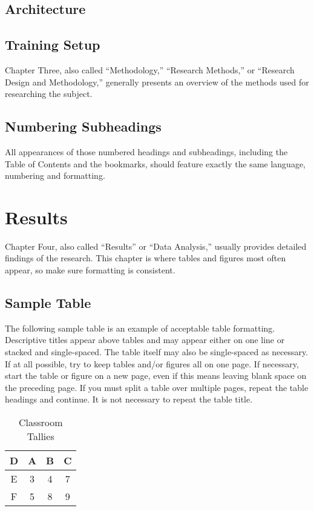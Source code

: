 \documentclass{UCF_ETD}
\begin{document}
\section{Architecture}

\section{Training Setup}

Chapter Three, also called “Methodology,” “Research Methods,” or “Research Design and Methodology,” generally presents an overview of the methods used for researching the subject.

\section{Numbering Subheadings}
All appearances of those numbered headings and subheadings, including the Table of Contents and the bookmarks, should feature exactly the same language, numbering and formatting.

\chapter{Results}
Chapter Four, also called ``Results'' or ``Data Analysis,'' usually provides detailed findings of the research.  This chapter is where tables and figures most often appear, so make sure formatting is consistent.

\section{Sample Table}
The following sample table is an example of acceptable table formatting. Descriptive titles appear above tables and may appear either on one line or stacked and single-spaced. The table itself may also be single-spaced as necessary. If at all possible, try to keep tables and/or figures all on one page. If necessary, start the table or figure on a new page, even if this means leaving blank space on the preceding page. If you must split a table over multiple pages, repeat the table headings and continue. It is not necessary to repeat the table title.


\begin{table}[h]
\centering
\caption{Classroom Tallies}
\begin{tabular}{ |c|c|c|c|}
\hline
D & A & B & C\\
\hline
E &  3  & 4 & 7\\
\hline
F  &  5   & 8 & 9\\
\hline
\end{tabular}
\end{table}
\end{document}
